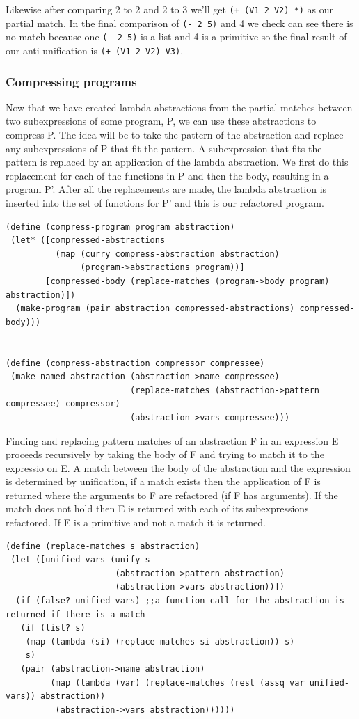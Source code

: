 \documentclass[a4paper,10pt]{article}
\begin{document}
Likewise after comparing 2 to 2 and 2 to 3 we'll get \texttt{(+ (V1 2 V2) *)} as our partial match.
In the final comparison of \texttt{(- 2 5)} and 4 we check can see there is no match because one \texttt{(- 2 5)} is a list and 4 is a primitive so the final result of our anti-unification is \texttt{(+ (V1 2 V2) V3)}.


\subsubsection{Compressing programs}
Now that we have created lambda abstractions from the partial matches between two subexpressions of some program, P, we can use these abstractions to compress P.  The idea will be to take the pattern of the abstraction and replace any subexpressions of P that fit the pattern.  A subexpression that fits the pattern is replaced by an application of the lambda abstraction.  We first do this replacement for each of the functions in P and then the body, resulting in a program P'.  After all the replacements are made, the lambda abstraction is inserted into the set of functions for P' and this is our refactored program.
\begin{lstlisting}[frame=trBL]
(define (compress-program program abstraction)
 (let* ([compressed-abstractions 
          (map (curry compress-abstraction abstraction)
               (program->abstractions program))]
        [compressed-body (replace-matches (program->body program) abstraction)])
  (make-program (pair abstraction compressed-abstractions) compressed-body)))
                           

(define (compress-abstraction compressor compressee)
 (make-named-abstraction (abstraction->name compressee)
                         (replace-matches (abstraction->pattern compressee) compressor)
                         (abstraction->vars compressee)))
\end{lstlisting}
Finding and replacing pattern matches of an abstraction F in an expression E proceeds recursively by taking the body of F and trying to match it to the expressio on E.  A match between the body of the abstraction and the expression is determined by unification, if a match exists then the application of F is returned where the arguments to F are refactored (if F has arguments).  If the match does not hold then E is returned with each of its subexpressions refactored.  If E is a primitive and not a match it is returned.

\begin{lstlisting}[frame=trBL]
(define (replace-matches s abstraction)
 (let ([unified-vars (unify s
                      (abstraction->pattern abstraction)
                      (abstraction->vars abstraction))])
  (if (false? unified-vars) ;;a function call for the abstraction is returned if there is a match
   (if (list? s)
    (map (lambda (si) (replace-matches si abstraction)) s)
    s)
   (pair (abstraction->name abstraction)  
         (map (lambda (var) (replace-matches (rest (assq var unified-vars)) abstraction))
          (abstraction->vars abstraction))))))
\end{lstlisting}
\end{document}
